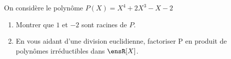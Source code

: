 \noindent On considère le polynôme $P(X) = X^4 + 2X^3 - X - 2$

\begin{enumerate}
    \item Montrer que $1$ et $-2$ sont racines de $P$.
    \item En vous aidant d'une division euclidienne, factoriser P en produit de polynômes irréductibles dans $\ensR[X]$.
\end{enumerate}